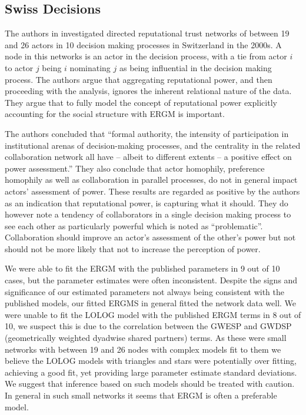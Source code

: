 \documentclass[
]{statsoc}
\begin{document}
\subsection{Swiss Decisions}

The authors in \cite{Fischer2015} investigated directed reputational
trust networks of between 19 and 26 actors in 10 decision making
processes in Switzerland in the 2000s. A node in this networks is an
actor in the decision process, with a tie from actor \(i\) to actor
\(j\) being \(i\) nominating \(j\) as being influential in the decision
making process. The authors argue that aggregating reputational power,
and then proceeding with the analysis, ignores the inherent relational
nature of the data. They argue that to fully model the concept of
reputational power explicitly accounting for the social structure with
ERGM is important.

The authors concluded that ``formal authority, the intensity of
participation in institutional arenas of decision-making processes, and
the centrality in the related collaboration network all have -- albeit
to different extents -- a positive effect on power assessment.'' They
also conclude that actor homophily, preference homophily as well as
collaboration in parallel processes, do not in general impact actors'
assessment of power. These results are regarded as positive by the
authors as an indication that reputational power, is capturing what it
should. They do however note a tendency of collaborators in a single
decision making process to see each other as particularly powerful which
is noted as ``problematic''. Collaboration should improve an actor's
assessment of the other's power but not should not be more likely that
not to increase the perception of power.

We were able to fit the ERGM with the published parameters in 9 out of
10 cases, but the parameter estimates were often inconsistent. Despite
the signs and significance of our estimated parameters not always being
consistent with the published models, our fitted ERGMS in general fitted
the network data well. We were unable to fit the LOLOG model with the
published ERGM terms in 8 out of 10, we suspect this is due to the
correlation between the GWESP and GWDSP (geometrically weighted dyadwise
shared partners) terms. As these were small networks with between 19 and
26 nodes with complex models fit to them we believe the LOLOG models
with triangles and stars were potentially over fitting, achieving a good
fit, yet providing large parameter estimate standard deviations. We
suggest that inference based on such models should be treated with
caution. In general in such small networks it seems that ERGM is often a
preferable model.
\end{document}
